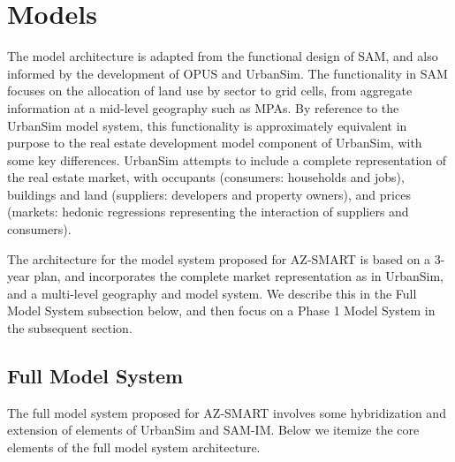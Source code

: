 \section{Models}

The model architecture is adapted from the functional design of SAM,
and also informed by the development of OPUS and UrbanSim. The
functionality in SAM focuses on the allocation of land use by
sector to grid cells, from aggregate information at a mid-level
geography such as MPAs.  By reference to the UrbanSim model system,
this functionality is approximately equivalent in purpose to the
real estate development model component of UrbanSim, with some key
differences.  UrbanSim attempts to include a complete representation
of the real estate market, with occupants (consumers: households
and jobs), buildings and land (suppliers: developers and property
owners), and prices (markets: hedonic regressions representing the
interaction of suppliers and consumers).

The architecture for the model system proposed for AZ-SMART is
based on a 3-year plan, and incorporates the complete market
representation as in UrbanSim, and a multi-level geography and
model system.  We describe this in the Full Model System subsection
 below, and then focus on a Phase 1 Model System in the subsequent
 section.

\subsection{Full Model System}
The full model system proposed for AZ-SMART involves some
hybridization and extension of elements of UrbanSim and SAM-IM.
Below we itemize the core elements of the full model system
architecture.

